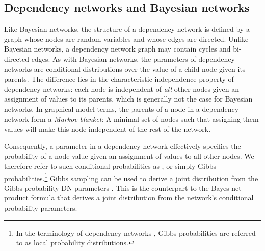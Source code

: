 \documentclass[runningheads,a4paper]{llncs}
\begin{document}
 \subsection{Dependency networks and Bayesian networks} Like Bayesian networks, the structure of a dependency network is defined by a graph whose nodes are random variables and whose edges are directed. Unlike Bayesian networks, a dependency network graph may contain cycles and bi-directed edges. As with Bayesian networks, the parameters of dependency networks are conditional distributions over the value of a child node given its parents. The difference lies in the characteristic independence property of dependency networks: each node is independent of {\em all} other nodes given an assignment of values to its parents, which is generally not the case for Bayesian networks.
In graphical model terms, the parents of a node in a dependency network form a {\em Markov blanket}: A minimal set of nodes such that assigning them values will make this node independent of the rest of the network. 

Consequently, a parameter in a dependency network effectively specifies the probability of a node value given an assignment of values to all other nodes. 
We therefore refer to such conditional probabilities as , or simply Gibbs probabilities.\footnote{In the terminology of dependency networks \cite{Heckerman2000},  Gibbs  probabilities are referred to as local probability distributions.}
Gibbs sampling can be used to derive a joint distribution from the Gibbs probability DN parameters \cite{Heckerman2000,Neville2007}. This is the counterpart to the Bayes net product formula that derives a joint distribution from the network's conditional probability parameters. 
\end{document}
